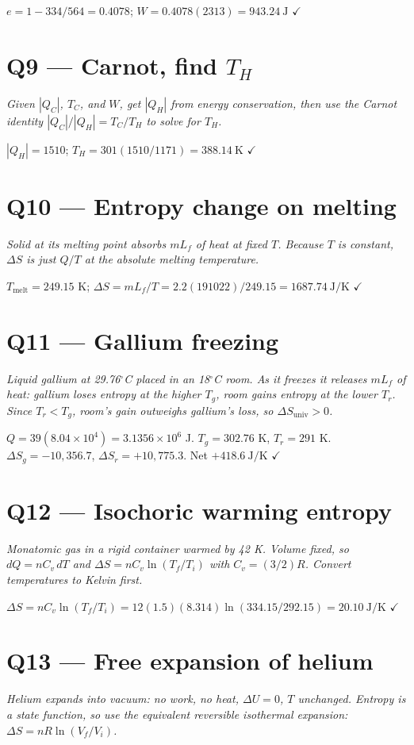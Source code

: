 \documentclass[11pt]{article}
\newcommand{\checkmk}{\ensuremath{\checkmark}}
\begin{document}
$e = 1 - 334/564 = 0.4078$; $W = 0.4078(2313) = \boxed{943.24\ \text{J}}$ \checkmk

\section*{Q9 --- Carnot, find $T_H$}
\emph{Given $|Q_C|$, $T_C$, and $W$, get $|Q_H|$ from energy conservation, then use the Carnot identity $|Q_C|/|Q_H| = T_C/T_H$ to solve for $T_H$.}

$|Q_H| = 1510$; $T_H = 301(1510/1171) = \boxed{388.14\ \text{K}}$ \checkmk

\section*{Q10 --- Entropy change on melting}
\emph{Solid at its melting point absorbs $mL_f$ of heat at fixed $T$. Because $T$ is constant, $\Delta S$ is just $Q/T$ at the absolute melting temperature.}

$T_{\text{melt}} = 249.15$ K; $\Delta S = mL_f/T = 2.2(191022)/249.15 = \boxed{1687.74\ \text{J/K}}$ \checkmk

\section*{Q11 --- Gallium freezing}
\emph{Liquid gallium at 29.76$^\circ$C placed in an 18$^\circ$C room. As it freezes it releases $mL_f$ of heat: gallium loses entropy at the higher $T_g$, room gains entropy at the lower $T_r$. Since $T_r < T_g$, room's gain outweighs gallium's loss, so $\Delta S_{\text{univ}} > 0$.}

$Q = 39(8.04\times10^4) = 3.1356\times10^6$ J. $T_g = 302.76$ K, $T_r = 291$ K.
$\Delta S_g = -10{,}356.7$, $\Delta S_r = +10{,}775.3$. Net $\boxed{+418.6\ \text{J/K}}$ \checkmk

\section*{Q12 --- Isochoric warming entropy}
\emph{Monatomic gas in a rigid container warmed by 42 K. Volume fixed, so $dQ = nC_v\,dT$ and $\Delta S = nC_v\ln(T_f/T_i)$ with $C_v = (3/2)R$. Convert temperatures to Kelvin first.}

$\Delta S = nC_v\ln(T_f/T_i) = 12(1.5)(8.314)\ln(334.15/292.15) = \boxed{20.10\ \text{J/K}}$ \checkmk

\section*{Q13 --- Free expansion of helium}
\emph{Helium expands into vacuum: no work, no heat, $\Delta U = 0$, $T$ unchanged. Entropy is a state function, so use the equivalent reversible isothermal expansion: $\Delta S = nR\ln(V_f/V_i)$.}
\end{document}
